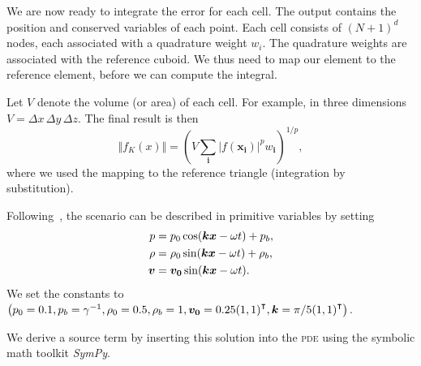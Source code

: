 We are now ready to integrate the error for each cell.
The output contains the position and conserved variables of each point.
Each cell consists of $(N + 1)^d$ nodes, each associated with a quadrature weight $w_i$.
The quadrature weights are associated with the reference cuboid.
We thus need to map our element to the reference element, before we can compute the integral.

Let $V$ denote the volume (or area) of each cell.
For example, in three dimensions $V = \Delta x \, \Delta y \, \Delta z$.
The final result is then
\begin{equation}
  \Vert f_K(x) \Vert = \left( V \sum_{\bm{i}} \vert f(\bm{x}_{\bm{i}}) \vert^p w_{{\bm{i}}}  \right)^{1/p},
\end{equation}
where we used the mapping to the reference triangle (integration by substitution).

Following~\cite{dumbser2010arbitrary}, the scenario can be described in primitive variables by setting
\begin{align}
  p &= p_0 \cos( \bm{k} \bm{x} - \omega t ) + p_b, \\
  \rho &= \rho_0 \sin (\bm{k} \bm{x} - \omega t) + \rho_b, \\
  \bm{v} &= \bm{v_0} \sin(\bm{k} \bm{x} - \omega t).
\end{align}
We set the constants to \( \left(  p_0 = 0.1, p_b = \gamma^{-1}, \rho_0 = 0.5, \rho_b = 1, 
\bm{v_0} = 0.25 {(1,1)}^\intercal, \bm{k} = \pi/5 {(1,1)}^\intercal \right) \).

We derive a source term by inserting this solution into the \textsc{pde} using the symbolic math toolkit \textit{SymPy}.

